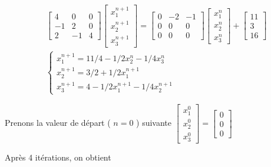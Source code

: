 \documentclass[10pt]{article}
\begin{document}
\[
\begin{aligned}
& {\left[\begin{array}{ccc}
4 & 0 & 0 \\
-1 & 2 & 0 \\
2 & -1 & 4
\end{array}\right]\left[\begin{array}{l}
x_{1}^{n+1} \\
x_{2}^{n+1} \\
x_{3}^{n+1}
\end{array}\right]=\left[\begin{array}{ccc}
0 & -2 & -1 \\
0 & 0 & 0 \\
0 & 0 & 0
\end{array}\right]\left[\begin{array}{l}
x_{1}^{n} \\
x_{2}^{n} \\
x_{3}^{n}
\end{array}\right]+\left[\begin{array}{c}
11 \\
3 \\
16
\end{array}\right]} \\
& \left\{\begin{array}{l}
x_{1}^{n+1}=11 / 4-1 / 2 x_{2}^{n}-1 / 4 x_{3}^{n} \\
x_{2}^{n+1}=3 / 2+1 / 2 x_{1}^{n+1} \\
x_{3}^{n+1}=4-1 / 2 x_{1}^{n+1}-1 / 4 x_{2}^{n+1}
\end{array}\right.
\end{aligned}
\]

Prenons la valeur de départ ( \(n=0\) ) suivante \(\left[\begin{array}{l}x_{1}^{0} \\ x_{2}^{0} \\ x_{3}^{0}\end{array}\right]=\left[\begin{array}{l}0 \\ 0 \\ 0\end{array}\right]\)

Après 4 itérations, on obtient
\end{document}
